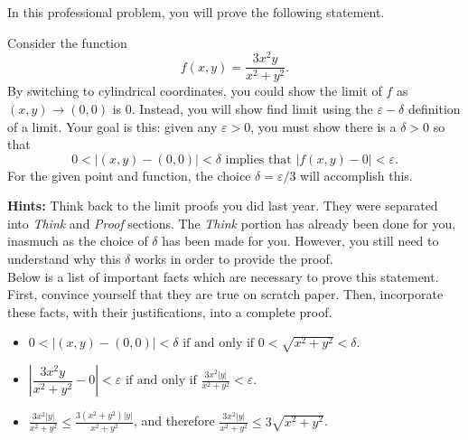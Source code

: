 \documentclass{ximera}
\begin{document}
\begin{problem}

In this professional problem, you will prove the following statement.


Consider the function
\[ f(x,y) = \dfrac{3x^2 y}{x^2+y^2}. \]
By switching to cylindrical coordinates, you could show the limit of $f$ as $(x,y)\to(0,0)$ is 0.  Instead, you will show find limit using the $\varepsilon -\delta$ definition of a limit.  Your goal is this: given any $\varepsilon > 0$, you must show there is a $\delta > 0$ so that 
\[ 0 < | (x,y) - (0,0) | < \delta \mbox{ implies that } |f(x,y)-0| < \varepsilon. \]
For the given point and function, the choice $\delta = \varepsilon/3$ will accomplish this.

\textbf{Hints:} Think back to the limit proofs you did last year.  They were separated into \textit{Think} and \textit{Proof} sections.  The \textit{Think} portion has already been done for you, inasmuch as the choice of $\delta$ has been made for you.  However, you still need to understand why this $\delta$ works in order to provide the proof.\\

Below is a list of important facts which are necessary to prove this statement. First, convince yourself that they are true on scratch paper. Then, incorporate these facts, with their justifications, into a complete proof.
\begin{itemize}

\item $ 0 < |(x,y)-(0,0)| < \delta  \mbox{ if and only if } 0 < \sqrt{x^2 + y^2} < \delta$.

\item  $\displaystyle \left|\dfrac{3x^2 y}{x^2+y^2} - 0 \right| < \varepsilon  \mbox{ if and only if } \frac{3x^2|y|}{x^2+y^2} < \varepsilon $.

\item $\displaystyle \frac{3x^2|y|}{x^2+y^2} \le \frac{3(x^{2}+y^{2})|y|}{x^{2}+y^{2}}$, and therefore $\displaystyle \frac{3x^2|y|}{x^2+y^2} \le 3\sqrt{x^2 + y^2}$.


\end{itemize}
\end{problem}
\end{document}

